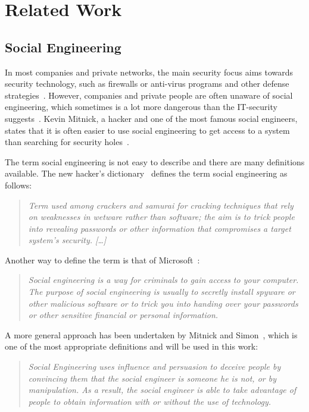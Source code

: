 \chapter{Related Work}
\label{chap:relatedwork}

\section{Social Engineering}

In most companies and private networks, the main security focus aims towards
security technology, such as firewalls or anti-virus programs and other defense
strategies~\cite{winkler1995}. However, companies and private people are often
unaware of social engineering, which sometimes is a lot more dangerous than the
IT-security suggests~\cite{jones2004}. Kevin Mitnick, a hacker and one of the
most famous social engineers, states that it is often easier to use social
engineering to get access to a system than searching for security
holes~\cite{mitnick2003}.

The term social engineering is not easy to describe and there are many
definitions available. 
The new hacker's dictionary~\cite{raymond1996} defines the term social engineering as
follows:
\begin{quote}
\textit{Term used among crackers and samurai for cracking techniques that rely on
weaknesses in wetware rather than software; the aim is to trick people into
revealing passwords or other information that compromises a target system's
security. [\dots]}
\end{quote}

Another way to define the term is that of Microsoft~\cite{microsoft2009}:
\begin{quote}
\textit{Social engineering is a way for criminals to gain access to your computer. The
purpose of social engineering is usually to secretly install spyware or other
malicious software or to trick you into handing over your passwords or other
sensitive financial or personal information.}
\end{quote}

A more general approach has been undertaken by Mitnick and Simon~\cite{mitnick2003}, which
is one of the most appropriate definitions and will be used in this work:
\begin{quote}
\textit{Social Engineering uses influence and persuasion to deceive people
by convincing them that the social engineer is someone he is not,
or by manipulation. As a result, the social engineer is able to take
advantage of people to obtain information with or without the use of
technology.}
\end{quote}


